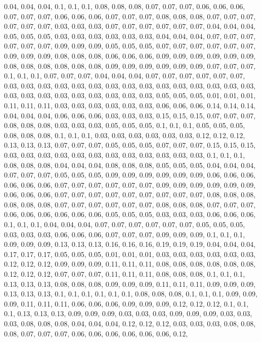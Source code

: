 \documentclass[
  ,man]{apa6}
\begin{document}
0.04, 0.04, 0.04, 0.1, 0.1, 0.1, 0.08, 0.08, 0.08, 0.07, 0.07, 0.07, 0.06, 0.06, 0.06, 0.07, 0.07, 0.07, 0.06, 0.06, 0.06, 0.07, 0.07, 0.07, 0.08, 0.08, 0.08, 0.07, 0.07, 0.07, 0.07, 0.07, 0.07, 0.03, 0.03, 0.03, 0.07, 0.07, 0.07, 0.07, 0.07, 0.07, 0.04, 0.04, 0.04, 0.05, 0.05, 0.05, 0.03, 0.03, 0.03, 0.03, 0.03, 0.03, 0.04, 0.04, 0.04, 0.07, 0.07, 0.07, 0.07, 0.07, 0.07, 0.09, 0.09, 0.09, 0.05, 0.05, 0.05, 0.07, 0.07, 0.07, 0.07, 0.07, 0.07, 0.09, 0.09, 0.09, 0.08, 0.08, 0.08, 0.06, 0.06, 0.06,
0.09, 0.09, 0.09, 0.09, 0.09, 0.09, 0.08, 0.08, 0.08, 0.08, 0.08, 0.08, 0.09, 0.09, 0.09, 0.09, 0.09, 0.09, 0.07, 0.07, 0.07, 0.1, 0.1, 0.1, 0.07, 0.07, 0.07, 0.04, 0.04, 0.04, 0.07, 0.07, 0.07, 0.07, 0.07, 0.07, 0.03, 0.03, 0.03, 0.03, 0.03, 0.03, 0.03, 0.03, 0.03, 0.03, 0.03, 0.03, 0.03, 0.03, 0.03, 0.03, 0.03, 0.03, 0.03, 0.03, 0.03, 0.03, 0.03, 0.03, 0.05, 0.05, 0.05, 0.01, 0.01, 0.01, 0.11, 0.11, 0.11, 0.03, 0.03, 0.03, 0.03, 0.03, 0.03, 0.06, 0.06, 0.06, 0.14, 0.14, 0.14, 0.04, 0.04, 0.04,
0.06, 0.06, 0.06, 0.03, 0.03, 0.03, 0.15, 0.15, 0.15, 0.07, 0.07, 0.07, 0.08, 0.08, 0.08, 0.03, 0.03, 0.03, 0.05, 0.05, 0.05, 0.1, 0.1, 0.1, 0.05, 0.05, 0.05, 0.08, 0.08, 0.08, 0.1, 0.1, 0.1, 0.03, 0.03, 0.03, 0.03, 0.03, 0.03, 0.12, 0.12, 0.12, 0.13, 0.13, 0.13, 0.07, 0.07, 0.07, 0.05, 0.05, 0.05, 0.07, 0.07, 0.07, 0.15, 0.15, 0.15, 0.03, 0.03, 0.03, 0.03, 0.03, 0.03, 0.03, 0.03, 0.03, 0.03, 0.03, 0.03, 0.1, 0.1, 0.1, 0.08, 0.08, 0.08, 0.04, 0.04, 0.04, 0.08, 0.08, 0.08, 0.05, 0.05, 0.05, 0.04,
0.04, 0.04, 0.07, 0.07, 0.07, 0.05, 0.05, 0.05, 0.09, 0.09, 0.09, 0.09, 0.09, 0.09, 0.06, 0.06, 0.06, 0.06, 0.06, 0.06, 0.07, 0.07, 0.07, 0.07, 0.07, 0.07, 0.09, 0.09, 0.09, 0.09, 0.09, 0.09, 0.06, 0.06, 0.06, 0.07, 0.07, 0.07, 0.07, 0.07, 0.07, 0.07, 0.07, 0.07, 0.08, 0.08, 0.08, 0.08, 0.08, 0.08, 0.07, 0.07, 0.07, 0.07, 0.07, 0.07, 0.08, 0.08, 0.08, 0.07, 0.07, 0.07, 0.06, 0.06, 0.06, 0.06, 0.06, 0.06, 0.05, 0.05, 0.05, 0.03, 0.03, 0.03, 0.06, 0.06, 0.06, 0.1, 0.1, 0.1, 0.04, 0.04, 0.04, 0.07,
0.07, 0.07, 0.07, 0.07, 0.07, 0.05, 0.05, 0.05, 0.03, 0.03, 0.03, 0.06, 0.06, 0.06, 0.07, 0.07, 0.07, 0.09, 0.09, 0.09, 0.1, 0.1, 0.1, 0.09, 0.09, 0.09, 0.13, 0.13, 0.13, 0.16, 0.16, 0.16, 0.19, 0.19, 0.19, 0.04, 0.04, 0.04, 0.17, 0.17, 0.17, 0.05, 0.05, 0.05, 0.01, 0.01, 0.01, 0.03, 0.03, 0.03, 0.03, 0.03, 0.03, 0.12, 0.12, 0.12, 0.09, 0.09, 0.09, 0.11, 0.11, 0.11, 0.08, 0.08, 0.08, 0.08, 0.08, 0.08, 0.12, 0.12, 0.12, 0.07, 0.07, 0.07, 0.11, 0.11, 0.11, 0.08, 0.08, 0.08, 0.1, 0.1, 0.1, 0.13, 0.13,
0.13, 0.08, 0.08, 0.08, 0.09, 0.09, 0.09, 0.11, 0.11, 0.11, 0.09, 0.09, 0.09, 0.13, 0.13, 0.13, 0.1, 0.1, 0.1, 0.1, 0.1, 0.1, 0.08, 0.08, 0.08, 0.1, 0.1, 0.1, 0.09, 0.09, 0.09, 0.11, 0.11, 0.11, 0.06, 0.06, 0.06, 0.09, 0.09, 0.09, 0.12, 0.12, 0.12, 0.1, 0.1, 0.1, 0.13, 0.13, 0.13, 0.09, 0.09, 0.09, 0.03, 0.03, 0.03, 0.09, 0.09, 0.09, 0.03, 0.03, 0.03, 0.08, 0.08, 0.08, 0.04, 0.04, 0.04, 0.12, 0.12, 0.12, 0.03, 0.03, 0.03, 0.08, 0.08, 0.08, 0.07, 0.07, 0.07, 0.06, 0.06, 0.06, 0.06, 0.06, 0.06, 0.12,
\end{document}
